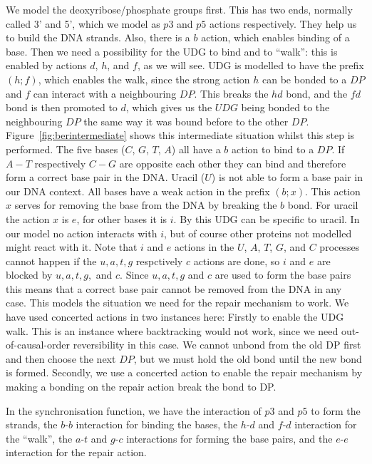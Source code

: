 \documentclass[review]{elsarticle}
\begin{document}
We model the deoxyribose/phosphate groups first. This has two ends, normally called 3' and 5', which we model as $p3$ and $p5$ actions respectively. They help us to build the DNA strands. Also, there is a $b$ action, which enables binding of a base. Then we need a possibility for the UDG to bind and to ``walk'': this is enabled by actions $d$, $h$, and $f$, as we will see. UDG is modelled to have the prefix $(h;f)$, which enables the walk, since the strong action $h$ can be bonded to a $DP$ and $f$ can interact with a neighbouring $DP$. This breaks the $hd$ bond, and the $fd$ bond is then promoted to $d$, which gives us the $UDG$ being bonded to the neighbouring $DP$ the same way it was bound before to the other $DP$. Figure~\ref{fig:berintermediate} shows this intermediate situation whilst this step is performed. The five bases ($C$, $G$, $T$, $A$) all have a $b$ action to bind to a $DP$. If $A-T$ respectively $C-G$ are opposite each other they can bind and therefore form a correct base pair in the DNA. Uracil ($U$) is not able to form a base pair in our DNA context. All bases have a weak action in the prefix $(b;x)$. This action $x$ serves for removing the base from the DNA by breaking the $b$ bond. For uracil the action $x$ is $e$, for other bases it is $i$. By this UDG can be specific to uracil. In our model no action interacts with $i$, but of course other proteins not modelled might react with it. Note that $i$ and $e$ actions in the $U$, $A$, $T$, $G$, and $C$ processes cannot happen if the $u, a, t, g$ respctively $c$ actions are done, so $i$ and $e$ are blocked by $u, a, t, g,$ and $c$. Since $u, a, t, g$ and $c$ are used to form the base pairs this means that a correct base pair cannot be removed from the DNA in any case. This models the situation we need for the repair mechanism to work. We have used concerted actions in two instances here: Firstly to enable the UDG walk. This is an instance where backtracking would not work, since we need out-of-causal-order reversibility in this case. We cannot unbond from the old DP first and then choose the next $DP$, but we must hold the old bond until the new bond is formed. Secondly, we use a concerted action to enable the repair mechanism by making a bonding on the repair action break the bond to DP.

In the synchronisation function, we have the interaction of $p3$ and $p5$ to form the strands, the $b$-$b$ interaction for binding the bases, the $h$-$d$ and $f$-$d$ interaction for the ``walk'', the $a$-$t$ and $g$-$c$ interactions for forming the base pairs, and the $e$-$e$ interaction for the repair action.
\end{document}
